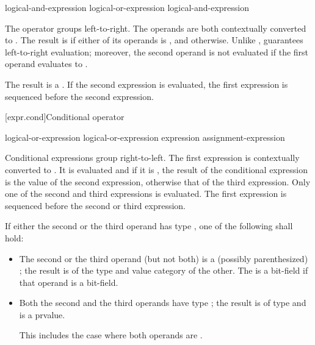 \begin{bnf}
\br
    logical-and-expression\br
    logical-or-expression \terminal{||} logical-and-expression
\end{bnf}

\pnum
The \tcode{||} operator groups left-to-right. The operands are both
contextually converted to .
The result is
 if either of its operands is , and
 otherwise. Unlike \tcode{|}, \tcode{||} guarantees
left-to-right evaluation; moreover, the second operand is not evaluated
if the first operand evaluates to .

\pnum
The result is a .
%
If the second expression is evaluated,
the first expression is sequenced before
the second expression.

[expr.cond]{Conditional operator}%
%
%
%

\begin{bnf}
\br
    logical-or-expression\br
    logical-or-expression  expression \terminal{:} assignment-expression
\end{bnf}

\pnum
Conditional expressions group right-to-left. The first expression is
contextually converted to .
It is
evaluated and if it is , the result of the conditional
expression is the value of the second expression, otherwise that of the
third expression. Only one of the second and third expressions is
evaluated.
The first expression is sequenced before
the second or third expression.

\pnum
If either the second or the third operand has type ,
one of the following shall hold:
\begin{itemize}
\item
{}%
The second or the third operand (but not both) is a (possibly
parenthesized) ; the result
is of the type and value category of the other.
The 
is a bit-field if that operand is a bit-field.

\item Both the second and the third operands have type ; the
result is of type  and is a prvalue.
\begin{note}
This
includes the case where both operands are .
\end{note}
\end{itemize}


